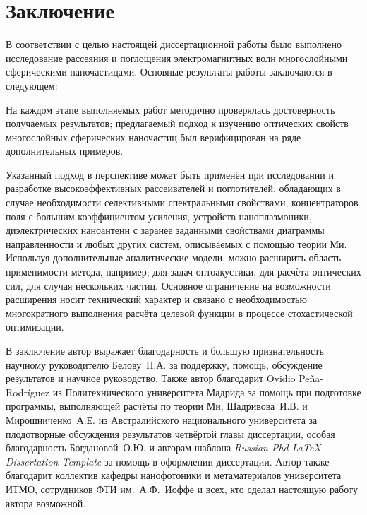 \chapter*{Заключение}						%

В соответствии с целью настоящей диссертационной работы было выполнено
исследование рассеяния и поглощения электромагнитных волн
многослойными сферическими наночастицами.
Основные результаты работы заключаются в следующем:

На каждом этапе выполняемых работ методично проверялась достоверность
получаемых результатов; предлагаемый подход к изучению оптических
свойств многослойных сферических наночастиц был верифицирован на ряде
дополнительных примеров.

Указанный подход в перспективе может быть применён при исследовании и
разработке высокоэффективных рассеивателей и поглотителей, обладающих
в случае необходимости селективными спектральными свойствами,
концентраторов поля с большим коэффициентом усиления, устройств
наноплазмоники, диэлектрических наноантенн с заранее заданными
свойствами диаграммы направленности и любых других систем, описываемых
с помощью теории Ми. Используя дополнительные аналитические модели,
можно расширить область применимости метода, например, для задач
оптоакустики, для расчёта оптических сил, для случая нескольких
частиц. Основное ограничение на возможности расширения носит
технический характер и связано с необходимостью многократного
выполнения расчёта целевой функции в процессе стохастической
оптимизации.

В заключение автор выражает благодарность и большую признательность
научному руководителю Белову~П.А. за поддержку, помощь, обсуждение
результатов и научное руководство. Также автор благодарит Ovidio
Pe\~{n}a-Rodr\'{i}guez из Политехнического университета Мадрида за
помощь при подготовке программы, выполняющей расчёты по теории Ми,
Шадривова~И.В. и Мирошниченко~А.Е. из Австралийского национального
университета за плодотворные обсуждения результатов четвёртой главы
диссертации, особая благодарность Богдановой~О.Ю. и авторам шаблона 
\textit{Russian-Phd-LaTeX-Dissertation-Template} за помощь в
оформлении диссертации. Автор также благодарит коллектив кафедры
нанофотоники и метаматериалов университета ИТМО, сотрудников ФТИ
им.~А.Ф.~Иоффе и всех, кто сделал настоящую работу автора возможной.
